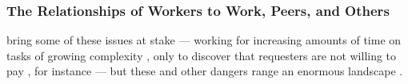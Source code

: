 \documentclass[trackingWork]{subfiles}
\begin{document}
\subsubsection[the relationships of workers]{The Relationships of Workers to Work, Peers, and Others}
\label{sec:relationships}
\subsubsubsection{\crowdworkpers}
    \citeauthor{professionalCrowdworkEthics} bring some of these issues at stake
    --- working for increasing amounts of time on tasks of growing complexity%
,     only to discover that requesters are not willing to pay%
,     for instance ---
    but these and other dangers range an enormous landscape
    \cite{crowdworkFuture,professionalCrowdworkEthics,nickerson2013crowd,dynamo}.

\end{document}
